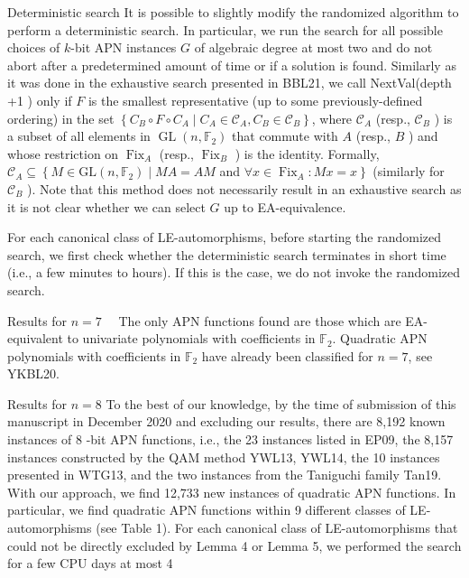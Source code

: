 \documentclass[10pt]{article}
\begin{document}
Deterministic search It is possible to slightly modify the randomized algorithm to perform a deterministic search. In particular, we run the search for all possible choices of $k$-bit APN instances $G$ of algebraic degree at most two and do not abort after a predetermined amount of time or if a solution is found. Similarly as it was done in the exhaustive search presented in BBL21, we call NextVal(depth +1 ) only if $F$ is the smallest representative (up to some previously-defined ordering) in the set $\left\{C_{B} \circ F \circ C_{A} \mid C_{A} \in \mathcal{C}_{A}, C_{B} \in \mathcal{C}_{B}\right\}$, where $\mathcal{C}_{A}$ (resp., $\mathcal{C}_{B}$ ) is a subset of all elements in $\operatorname{GL}\left(n, \mathbb{F}_{2}\right)$ that commute with $A$ (resp., $B$ ) and whose restriction on $\operatorname{Fix}_{A}$ (resp., $\operatorname{Fix}_{B}$ ) is the identity. Formally, $\mathcal{C}_{A} \subseteq\left\{M \in \mathrm{GL}\left(n, \mathbb{F}_{2}\right) \mid M A=A M\right.$ and $\left.\forall x \in \operatorname{Fix}_{A}: M x=x\right\}$ (similarly for $\mathcal{C}_{B}$ ). Note that this method does not necessarily result in an exhaustive search as it is not clear whether we can select $G$ up to EA-equivalence.

For each canonical class of LE-automorphisms, before starting the randomized search, we first check whether the deterministic search terminates in short time (i.e., a few minutes to hours). If this is the case, we do not invoke the randomized search.

Results for $n=7 \quad$ The only APN functions found are those which are EA-equivalent to univariate polynomials with coefficients in $\mathbb{F}_{2}$. Quadratic APN polynomials with coefficients in $\mathbb{F}_{2}$ have already been classified for $n=7$, see YKBL20.

Results for $n=8$ To the best of our knowledge, by the time of submission of this manuscript in December 2020 and excluding our results, there are 8,192 known instances of 8 -bit APN functions, i.e., the 23 instances listed in EP09, the 8,157 instances constructed by the QAM method YWL13, YWL14, the 10 instances presented in WTG13, and the two instances from the Taniguchi family Tan19. With our approach, we find 12,733 new instances of quadratic APN functions. In particular, we find quadratic APN functions within 9 different classes of LE-automorphisms (see Table 1). For each canonical class of LE-automorphisms that could not be directly excluded by Lemma 4 or Lemma 5, we performed the search for a few CPU days at most 4
\end{document}
